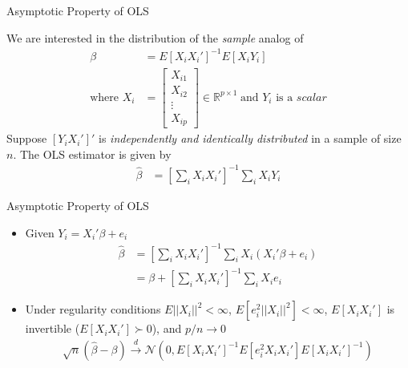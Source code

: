 \documentclass[aspectratio=1610,12pt,xcolor=dvipsnames]{beamer}
\begin{document}
\begin{frame}
  \subsectionpage
\end{frame}

\begin{frame}{Asymptotic Property of OLS}

We are interested in the distribution of the \textit{sample} analog of 
\begin{align*}
    \beta &= E[X_iX_i']^{-1}E[X_iY_i] \\
    \text{where } X_i &=
    \begin{bmatrix}
    X_{i1} \\
    X_{i2} \\
    \vdots \\
    X_{ip}
    \end{bmatrix}
    \in \mathbb{R}^{p\times 1} \hspace{3pt} 
    \text{and } Y_i \text{ is a } \textit{scalar}
\end{align*}
Suppose $[Y_i X_i']'$ is \textit{independently and identically distributed} in a sample of size $n$. The OLS estimator is given by
\begin{align*}
    \hat{\beta} &= \left[\sum_i X_i X_i' \right]^{-1} \sum_i X_i Y_i
\end{align*}
\end{frame}

\begin{frame}{Asymptotic Property of OLS}
    \begin{itemize}
        \item Given $Y_i = X_i'\beta + e_i$
        \begin{align*}
        \hat{\beta} &= \left[\sum_i X_i X_i' \right]^{-1} \sum_i X_i \left( X_i'\beta + e_i \right) \\
        &= \beta + \left[\sum_i X_i X_i' \right]^{-1} \sum_i X_ie_i
        \end{align*}
        \item Under regularity conditions $E||X_i||^2 < \infty$, $E\left[e_i^2||X_i||^2\right] < \infty$, $E[X_iX_i']$ is  invertible ($E[X_iX_i'] \succ 0$), and $p/n \rightarrow 0$
        \begin{align*}
            \sqrt{n}(\hat{\beta}-\beta) \xrightarrow{d} \mathcal{N}\left( 0, E[X_iX_i']^{-1}E[e_i^2 X_i X_i'] E[X_iX_i']^{-1} \right)
        \end{align*}
    \end{itemize}
\end{frame}
\end{document}

